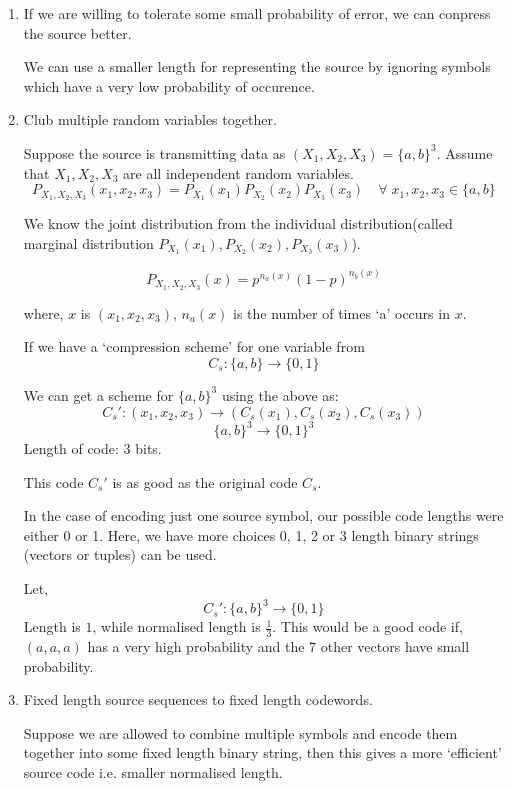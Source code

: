 \documentclass{article}
\begin{document}
\begin{enumerate}
    \item If we are willing to tolerate some small probability of error, we can conpress the source better.

    We can use a smaller length for representing the source by ignoring symbols which have a very low probability of occurence.

    \item Club multiple random variables together.

    Suppose the source is transmitting data as $(X_1,X_2,X_3)= \{ a,b\}^3$. Assume that $X_1,X_2,X_3$ are all independent random variables.
    $$ P_{X_1,X_2,X_3}(x_1,x_2,x_3)=P_{X_1}(x_1)P_{X_2}(x_2)P_{X_3}(x_3) \quad \forall \; x_1,x_2,x_3 \in \{a,b\}$$

    We know the joint distribution from the individual distribution(called marginal distribution $P_{X_1}(x_1),P_{X_2}(x_2),P_{X_3}(x_3)$).

    $$ P_{X_1,X_2,X_3}(x)= p^{n_a (x)}(1-p)^{n_b (x)}$$

    where, $x$ is $(x_1,x_2,x_3)$, $n_a(x)$ is the number of times `a' occurs in $x$.

    If we have a `compression scheme' for one variable from
    $$ C_s :\{a,b \} \to \{ 0,1 \}$$

    We can get a scheme for $\{a,b\}^3$ using the above as:
    $$ C_{s}':(x_1,x_2,x_3) \to (C_s(x_1),C_s(x_2),C_s(x_3))$$
    $$\{ a,b\}^3 \to \{ 0,1\}^3$$
    Length of code: 3 bits.

    This code $C_{s}'$ is as good as the original code $C_s$.

    In the case of encoding just one source symbol, our possible code lengths were either 0 or 1. Here, we have more choices 0, 1, 2 or 3 length binary strings (vectors or tuples) can be used.

    Let,
    $$C_{s}':\{ a,b\}^3 \to \{ 0,1\} $$
    Length is $1$, while normalised length is $\frac{1}{3}$. This would be a good code if, $(a,a,a)$ has a very high probability and the 7 other vectors have small probability.

    \item Fixed length source sequences to fixed length codewords.

    Suppose we are allowed to combine multiple symbols and encode them together into some fixed length binary string, then this gives a more `efficient' source code i.e. smaller normalised length.


\end{enumerate}
\end{document}
